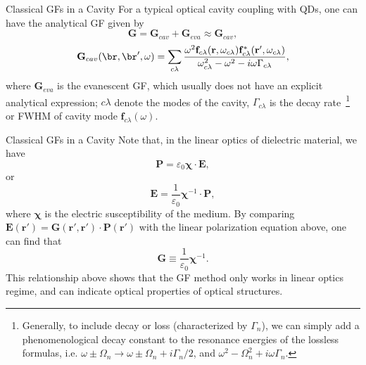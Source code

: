\documentclass{beamer}
\begin{document}
\begin{frame}{Classical GFs in a Cavity}
\fontsize{9}{-0.2}\selectfont
For a typical optical cavity coupling with QDs, one can have the analytical GF given by
\begin{equation}
 \label{Ganal}
\mathbf{G}=\mathbf{G}_{cav}+\mathbf{G}_{eva}\approx \mathbf{G}_{cav},
\end{equation}
\begin{equation}
 \label{Gcav}
\mathbf{G}_{cav}(\br,\br',\omega)=\sum_{c\lambda}{\frac{\omega^2\mathbf{f}_{c\lambda}(\mathbf{r},\omega_{c\lambda})\mathbf{f}_{c\lambda}^*(\mathbf{r}',\omega_{c\lambda})}
{\omega_{c\lambda}^2-\omega^2-i\omega\Gamma_{c\lambda}}},
\end{equation}
where $\mathbf{G}_{eva}$ is the evanescent GF, which usually does not have an explicit analytical expression; $c\lambda$ denote the modes of the cavity, $\Gamma_{c\lambda}$ is the decay rate~\footnote{Generally, to include decay or loss (characterized by $\Gamma_n$), we can simply add a phenomenological decay constant to the resonance energies of the lossless formulas, i.e.
$\omega \pm \Omega_n \rightarrow \omega\pm \Omega_n +
i\Gamma_n/2$, and $\omega^2- \Omega_n^2+
i\omega\Gamma_n$.\label{fn:decayrevision}} or FWHM of cavity mode $\mathbf{f}_{c\lambda}(\omega)$.
\end{frame}

\begin{frame}{Classical GFs in a Cavity}
\fontsize{9}{-0.2}\selectfont
Note that, in the linear optics of dielectric material, we have
\begin{equation}
\mathbf{P}=\varepsilon_0\mathbf{\chi} \cdot \mathbf{E},
\end{equation}
or
\begin{equation}\label{eq:polarization}
\mathbf{E}=\frac{1}{\varepsilon_0}\mathbf{\chi}^{-1} \cdot \mathbf{P},
\end{equation}
where $\mathbf{\chi}$ is the electric susceptibility of the medium.
By comparing $\mathbf{E}(\mathbf{r}')=\mathbf{G}(\mathbf{r}',\mathbf{r}') \cdot \mathbf{P}(\mathbf{r}')$ with the linear polarization equation above, one can find that 
\begin{equation}
\mathbf{G}\equiv \frac{1}{\varepsilon_0}\mathbf{\chi}^{-1}.
\end{equation}
This relationship above shows that the GF method only works in linear optics regime, and can indicate optical properties of optical structures.
\end{frame}
\end{document}
